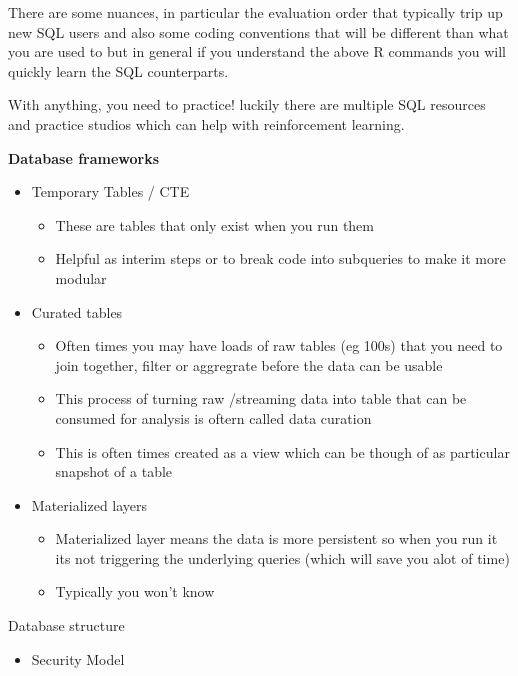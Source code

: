 \documentclass[
  letterpaper,
  DIV=11,
  numbers=noendperiod]{scrreprt}
\providecommand{\tightlist}{%
  \setlength{\itemsep}{0pt}\setlength{\parskip}{0pt}}\usepackage{longtable,booktabs,array}
\begin{document}
\begin{tcolorbox}
There are some nuances, in particular the evaluation order that
typically trip up new SQL users and also some coding conventions that
will be different than what you are used to but in general if you
understand the above R commands you will quickly learn the SQL
counterparts.

With anything, you need to practice! luckily there are multiple SQL
resources and practice studios which can help with reinforcement
learning.

\textbf{Database frameworks}

\begin{itemize}
\item
  Temporary Tables / CTE

  \begin{itemize}
  \tightlist
  \item
    These are tables that only exist when you run them
  \item
    Helpful as interim steps or to break code into subqueries to make it
    more modular
  \end{itemize}
\item
  Curated tables

  \begin{itemize}
  \tightlist
  \item
    Often times you may have loads of raw tables (eg 100s) that you need
    to join together, filter or aggregrate before the data can be usable
  \item
    This process of turning raw /streaming data into table that can be
    consumed for analysis is oftern called data curation
  \item
    This is often times created as a view which can be though of as
    particular snapshot of a table
  \end{itemize}
\item
  Materialized layers

  \begin{itemize}
  \tightlist
  \item
    Materialized layer means the data is more persistent so when you run
    it its not triggering the underlying queries (which will save you
    alot of time)\\
  \item
    Typically you won't know
  \end{itemize}
\end{itemize}

Database structure

\begin{itemize}
\item
  Security Model


\end{itemize}
\end{tcolorbox}
\end{document}
